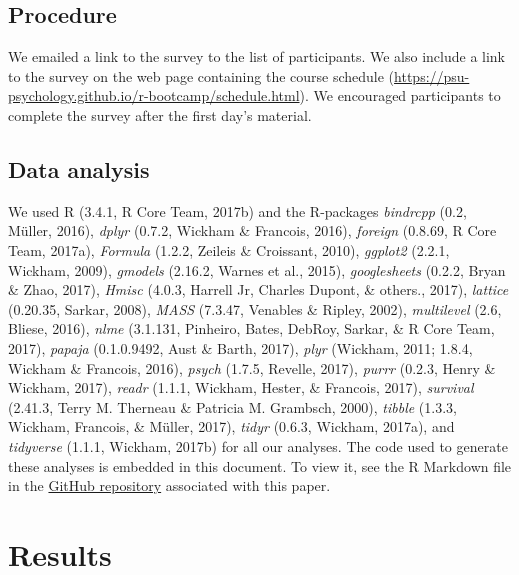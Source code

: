 \documentclass[english,man]{apa6}
\theoremstyle{definition}
\theoremstyle{definition}
\theoremstyle{remark}
\begin{document}
\subsection{Procedure}\label{procedure}

We emailed a link to the survey to the list of participants. We also
include a link to the survey on the web page containing the course
schedule
(\url{https://psu-psychology.github.io/r-bootcamp/schedule.html}). We
encouraged participants to complete the survey after the first day's
material.

\subsection{Data analysis}\label{data-analysis}

We used R (3.4.1, R Core Team, 2017b) and the R-packages \emph{bindrcpp}
(0.2, Müller, 2016), \emph{dplyr} (0.7.2, Wickham \& Francois, 2016),
\emph{foreign} (0.8.69, R Core Team, 2017a), \emph{Formula} (1.2.2,
Zeileis \& Croissant, 2010), \emph{ggplot2} (2.2.1, Wickham, 2009),
\emph{gmodels} (2.16.2, Warnes et al., 2015), \emph{googlesheets}
(0.2.2, Bryan \& Zhao, 2017), \emph{Hmisc} (4.0.3, Harrell Jr, Charles
Dupont, \& others., 2017), \emph{lattice} (0.20.35, Sarkar, 2008),
\emph{MASS} (7.3.47, Venables \& Ripley, 2002), \emph{multilevel} (2.6,
Bliese, 2016), \emph{nlme} (3.1.131, Pinheiro, Bates, DebRoy, Sarkar, \&
R Core Team, 2017), \emph{papaja} (0.1.0.9492, Aust \& Barth, 2017),
\emph{plyr} (Wickham, 2011; 1.8.4, Wickham \& Francois, 2016),
\emph{psych} (1.7.5, Revelle, 2017), \emph{purrr} (0.2.3, Henry \&
Wickham, 2017), \emph{readr} (1.1.1, Wickham, Hester, \& Francois,
2017), \emph{survival} (2.41.3, Terry M. Therneau \& Patricia M.
Grambsch, 2000), \emph{tibble} (1.3.3, Wickham, Francois, \& Müller,
2017), \emph{tidyr} (0.6.3, Wickham, 2017a), and \emph{tidyverse}
(1.1.1, Wickham, 2017b) for all our analyses. The code used to generate
these analyses is embedded in this document. To view it, see the R
Markdown file in the
\href{http://github.com/psu-psychology/r-bootcamp/papaja-demo/}{GitHub
repository} associated with this paper.

\section{Results}\label{results}
\end{document}
